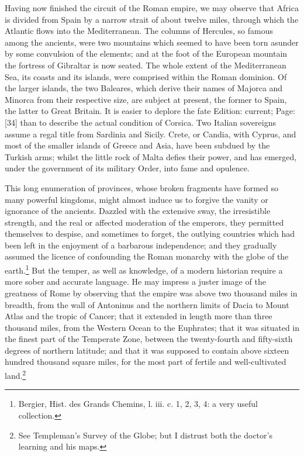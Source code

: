Having now finished the circuit of the Roman empire, we may observe that Africa is divided from Spain by a narrow strait of about twelve miles, through which the Atlantic flows into the Mediterranean. The columns of Hercules, so famous among the ancients, were two mountains which seemed to have been torn asunder by some convulsion of the elements; and at the foot of the European mountain the fortress of Gibraltar is now seated. The whole extent of the Mediterranean Sea, its coasts and its islands, were comprised within the Roman dominion. Of the larger islands, the two Baleares, which derive their names of Majorca and Minorca from their respective size, are subject at present, the former to Spain, the latter to Great Britain. It is easier to deplore the fate Edition: current; Page: [34] than to describe the actual condition of Corsica. Two Italian sovereigns assume a regal title from Sardinia and Sicily. Crete, or Candia, with Cyprus, and most of the smaller islands of Greece and Asia, have been subdued by the Turkish arms; whilst the little rock of Malta defies their power, and has emerged, under the government of its military Order, into fame and opulence.

This long enumeration of provinces, whose broken fragments have formed so many powerful kingdoms, might almost induce us to forgive the vanity or ignorance of the ancients. Dazzled with the extensive sway, the irresistible strength, and the real or affected moderation of the emperors, they permitted themselves to despise, and sometimes to forget, the outlying countries which had been left in the enjoyment of a barbarous independence; and they gradually assumed the licence of confounding the Roman monarchy with the globe of the earth.\footnote{Bergier, Hist. des Grands Chemins, l. iii. c. 1, 2, 3, 4: a very useful collection.} But the temper, as well as knowledge, of a modern historian require a more sober and accurate language. He may impress a juster image of the greatness of Rome by observing that the empire was above two thousand miles in breadth, from the wall of Antoninus and the northern limits of Dacia to Mount Atlas and the tropic of Cancer; that it extended in length more than three thousand miles, from the Western Ocean to the Euphrates; that it was situated in the finest part of the Temperate Zone, between the twenty-fourth and fifty-sixth degrees of northern latitude; and that it was supposed to contain above sixteen hundred thousand square miles, for the most part of fertile and well-cultivated land.\footnote{See Templeman\texthebrew{}’s Survey of the Globe; but I distrust both the doctor\texthebrew{}’s learning and his maps.}


